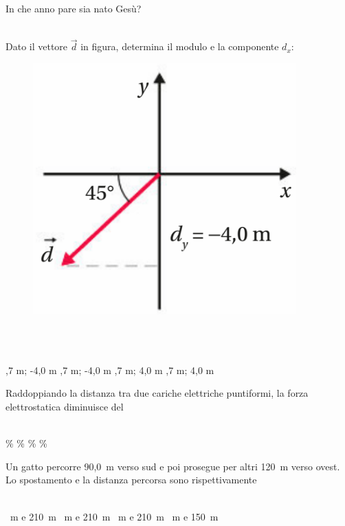 \documentclass[a4paper,11pt]{exam}
\begin{document}
\begin{questions}
    
\question In che anno pare sia nato Gesù?\\\
\begin{oneparchoices}
\end{oneparchoices}

    
\question Dato il vettore $\vec{d}$ in figura, determina il modulo e la componente $d_x$: \begin{figure}[h!]   \begin{center}     \includegraphics[scale=0.35]{vettored.png}   \end{center} \end{figure}\\\
\begin{oneparchoices}
  ,7 m; -4,0 m
  ,7 m; -4,0 m
  \choice 5,7 m; 4,0 m
  \choice -5,7 m; 4,0 m
\end{oneparchoices}

    
\question Raddoppiando la distanza tra due cariche elettriche puntiformi, la forza elettrostatica diminuisce del\\\
\begin{oneparchoices}
  \choice 50\%
  \choice 25\%
  \%
  \%
\end{oneparchoices}

    
\question Un gatto percorre 90,0~m verso sud e poi prosegue per altri 120~m verso ovest. Lo spostamento e la distanza percorsa sono rispettivamente\\\
\begin{oneparchoices}
  ~m e 210~m
  \choice 30~m e 210~m
  \choice 150~m e 210~m
  \choice 210~m e 150~m
\end{oneparchoices}


\end{questions}
\end{document}
